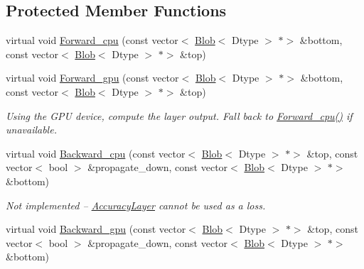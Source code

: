 \subsection*{Protected Member Functions}
\begin{DoxyCompactItemize}
\item 
virtual void \mbox{\hyperlink{classcaffe_1_1_accuracy_layer_ad61bb4c6984d9df6a61562cd5c19ff6d}{Forward\+\_\+cpu}} (const vector$<$ \mbox{\hyperlink{classcaffe_1_1_blob}{Blob}}$<$ Dtype $>$ $\ast$$>$ \&bottom, const vector$<$ \mbox{\hyperlink{classcaffe_1_1_blob}{Blob}}$<$ Dtype $>$ $\ast$$>$ \&top)
\item 
\mbox{\label{classcaffe_1_1_accuracy_layer_a0c720e010f5ba0bd4ef3582d32ce37a9}} 
virtual void \mbox{\hyperlink{classcaffe_1_1_accuracy_layer_a0c720e010f5ba0bd4ef3582d32ce37a9}{Forward\+\_\+gpu}} (const vector$<$ \mbox{\hyperlink{classcaffe_1_1_blob}{Blob}}$<$ Dtype $>$ $\ast$$>$ \&bottom, const vector$<$ \mbox{\hyperlink{classcaffe_1_1_blob}{Blob}}$<$ Dtype $>$ $\ast$$>$ \&top)
\begin{DoxyCompactList}\small\item\em Using the G\+PU device, compute the layer output. Fall back to \mbox{\hyperlink{classcaffe_1_1_accuracy_layer_ad61bb4c6984d9df6a61562cd5c19ff6d}{Forward\+\_\+cpu()}} if unavailable. \end{DoxyCompactList}\item 
\mbox{\label{classcaffe_1_1_accuracy_layer_a8084d42629a751f5b6322d9cb3f5986c}} 
virtual void \mbox{\hyperlink{classcaffe_1_1_accuracy_layer_a8084d42629a751f5b6322d9cb3f5986c}{Backward\+\_\+cpu}} (const vector$<$ \mbox{\hyperlink{classcaffe_1_1_blob}{Blob}}$<$ Dtype $>$ $\ast$$>$ \&top, const vector$<$ bool $>$ \&propagate\+\_\+down, const vector$<$ \mbox{\hyperlink{classcaffe_1_1_blob}{Blob}}$<$ Dtype $>$ $\ast$$>$ \&bottom)
\begin{DoxyCompactList}\small\item\em Not implemented -- \mbox{\hyperlink{classcaffe_1_1_accuracy_layer}{Accuracy\+Layer}} cannot be used as a loss. \end{DoxyCompactList}\item 
\mbox{\label{classcaffe_1_1_accuracy_layer_a4cd3015639d107e63f90672733ac019a}} 
virtual void \mbox{\hyperlink{classcaffe_1_1_accuracy_layer_a4cd3015639d107e63f90672733ac019a}{Backward\+\_\+gpu}} (const vector$<$ \mbox{\hyperlink{classcaffe_1_1_blob}{Blob}}$<$ Dtype $>$ $\ast$$>$ \&top, const vector$<$ bool $>$ \&propagate\+\_\+down, const vector$<$ \mbox{\hyperlink{classcaffe_1_1_blob}{Blob}}$<$ Dtype $>$ $\ast$$>$ \&bottom)

\end{DoxyCompactItemize}
